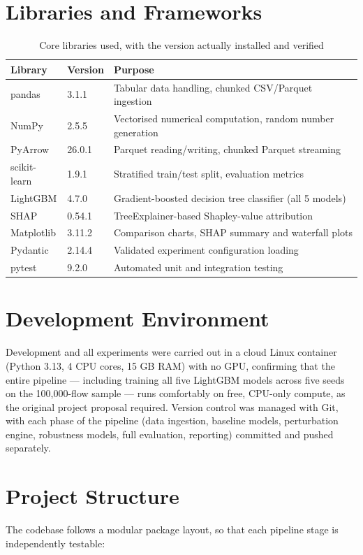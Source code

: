 \documentclass[12pt,a4paper]{report}
\begin{document}
\section{Libraries and Frameworks}
\begin{table}[h]\centering
\caption{Core libraries used, with the version actually installed and verified}
\begin{tabularx}{\linewidth}{XXX}
\toprule
\textbf{Library} & \textbf{Version} & \textbf{Purpose} \\
\midrule
pandas & 3.1.1 & Tabular data handling, chunked CSV/Parquet ingestion \\
NumPy & 2.5.5 & Vectorised numerical computation, random number generation \\
PyArrow & 26.0.1 & Parquet reading/writing, chunked Parquet streaming \\
scikit-learn & 1.9.1 & Stratified train/test split, evaluation metrics \\
LightGBM & 4.7.0 & Gradient-boosted decision tree classifier (all 5 models) \\
SHAP & 0.54.1 & TreeExplainer-based Shapley-value attribution \\
Matplotlib & 3.11.2 & Comparison charts, SHAP summary and waterfall plots \\
Pydantic & 2.14.4 & Validated experiment configuration loading \\
pytest & 9.2.0 & Automated unit and integration testing \\
\bottomrule
\end{tabularx}
\end{table}
\section{Development Environment}
Development and all experiments were carried out in a cloud Linux container (Python 3.13, 4 CPU cores, 15 GB RAM) with no GPU, confirming that the entire pipeline --- including training all five LightGBM models across five seeds on the 100,000-flow sample --- runs comfortably on free, CPU-only compute, as the original project proposal required. Version control was managed with Git, with each phase of the pipeline (data ingestion, baseline models, perturbation engine, robustness models, full evaluation, reporting) committed and pushed separately.

\section{Project Structure}
The codebase follows a modular package layout, so that each pipeline stage is independently testable:
\end{document}
